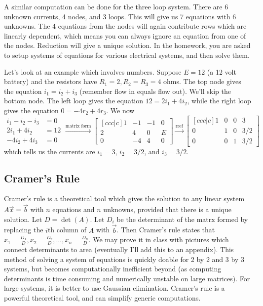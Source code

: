 A similar computation can be done for the three loop system. There are 6 unknown currents, 4 nodes, and 3 loops.  This will give us 7 equations with 6 unknowns.  The 4 equations from the nodes will again contribute rows which are linearly dependent, which means you can always ignore an equation from one of the nodes. Reduction will give a unique solution. In the homework, you are asked to setup systems of equations for various electrical systems, and then solve them. 


\begin{example} \label{electrical example}Let's look at an example which involves numbers.  Suppose $E=12$ (a 12 volt battery) and the resistors have $R_1=2, R_2=R_3=4$ ohms. The top node gives the equation $i_1=i_2+i_3$ (remember flow in equals flow out). We'll skip the bottom node.  The left loop gives the equation $12 = 2i_1+4i_2$, while the right loop gives the equation $0=-4r_2+4r_3$.  We now 
$$
\begin{array}{rl}
i_1-i_2-i_3&=0\\
2i_1+4i_2&=12\\
-4 i_2 +4i_3&=0
\end{array}
\xrightarrow{\text{matrix form}}
\begin{bmatrix}[ccc|c]
1&-1&-1&0\\
2&4&0&E\\
0&-4&4&0
\end{bmatrix}
\xrightarrow{\text{rref}}
\begin{bmatrix}[ccc|c]
 1 & 0 & 0 & 3\\
 0 & 1 & 0 & 3/2\\
 0 & 0 & 1 & 3/2
\end{bmatrix}
$$
which tells us the currents are $i_1=3$, $i_2=3/2$, and $i_3=3/2$.
\end{example}






\subsection{Cramer's Rule}
Cramer's rule is a theoretical tool which gives the solution to any linear system $A\vec x = \vec b$ with $n$ equations and $n$ unknowns, provided that there is a unique solution.  Let $D=\det(A)$. Let $D_i$ be the determinant of the matrx formed by replacing the $i$th column of $A$ with $\vec b$.  Then Cramer's rule states that $x_1 = \frac{D_1}{D},x_2 = \frac{D_2}{D},\ldots, x_n = \frac{D_n}{D}$. We may prove it in class with pictures which connect determinants to area (eventually I'll add this to an appendix). This method of solving a system of equations is quickly doable for 2 by 2 and 3 by 3 systems, but becomes computationally inefficient beyond (as computing determinants is time consuming and numerically unstable on large matrices). For large systems, it is better to use Gaussian elimination.  Cramer's rule is a powerful theoretical tool, and can simplify generic computations. 

